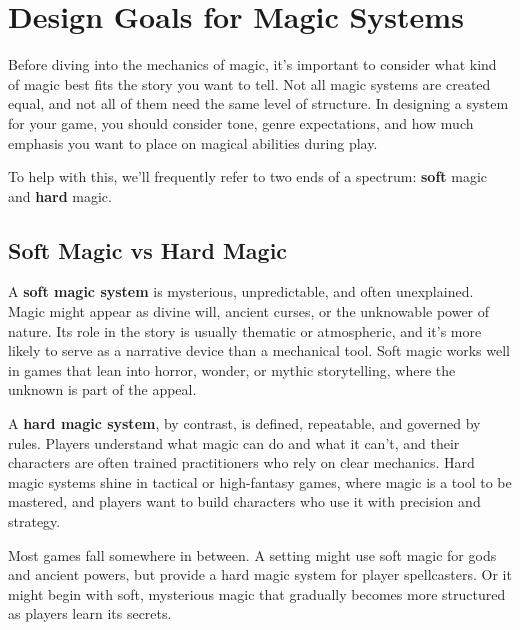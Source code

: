 \section{Design Goals for Magic Systems}

Before diving into the mechanics of magic, it's important to consider what kind of magic best fits the story you want to tell. Not all magic systems are created equal, and not all of them need the same level of structure. In designing a system for your game, you should consider tone, genre expectations, and how much emphasis you want to place on magical abilities during play.

To help with this, we’ll frequently refer to two ends of a spectrum: \textbf{soft} magic and \textbf{hard} magic.

\subsection{Soft Magic vs Hard Magic}

A \textbf{soft magic system} is mysterious, unpredictable, and often unexplained. Magic might appear as divine will, ancient curses, or the unknowable power of nature. Its role in the story is usually thematic or atmospheric, and it's more likely to serve as a narrative device than a mechanical tool. Soft magic works well in games that lean into horror, wonder, or mythic storytelling, where the unknown is part of the appeal.

A \textbf{hard magic system}, by contrast, is defined, repeatable, and governed by rules. Players understand what magic can do and what it can’t, and their characters are often trained practitioners who rely on clear mechanics. Hard magic systems shine in tactical or high-fantasy games, where magic is a tool to be mastered, and players want to build characters who use it with precision and strategy.

Most games fall somewhere in between. A setting might use soft magic for gods and ancient powers, but provide a hard magic system for player spellcasters. Or it might begin with soft, mysterious magic that gradually becomes more structured as players learn its secrets.

